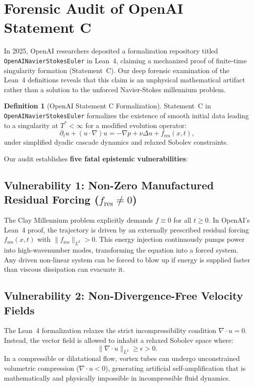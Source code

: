 \documentclass[10pt,a4paper,twocolumn]{article}
\theoremstyle{definition}
\newtheorem{definition}{Definition}[section]
\begin{document}
\section{Forensic Audit of OpenAI Statement C}

In 2025, OpenAI researchers deposited a formalization repository titled \texttt{OpenAINavierStokesEuler} in Lean~4, claiming a mechanized proof of finite-time singularity formation (Statement~C). Our deep forensic examination of the Lean~4 definitions reveals that this claim is an unphysical mathematical artifact rather than a solution to the unforced Navier-Stokes millennium problem.

\begin{definition}[OpenAI Statement C Formalization]
Statement~C in \texttt{OpenAINavierStokesEuler} formalizes the existence of smooth initial data leading to a singularity at $T^* < \infty$ for a modified evolution operator:
\begin{equation}
\partial_t u + (u \cdot \nabla) u = -\nabla p + \nu \Delta u + f_{\text{res}}(x, t),
\label{eq:openai_pde}
\end{equation}
under simplified dyadic cascade dynamics and relaxed Sobolev constraints.
\end{definition}

Our audit establishes \textbf{five fatal epistemic vulnerabilities}:

\subsection{Vulnerability 1: Non-Zero Manufactured Residual Forcing ($f_{\text{res}} \ne 0$)}
The Clay Millennium problem explicitly demands $f \equiv 0$ for all $t \ge 0$. In OpenAI's Lean~4 proof, the trajectory is driven by an externally prescribed residual forcing $f_{\text{res}}(x, t)$ with $\|f_{\text{res}}\|_{L^2} > 0$. This energy injection continuously pumps power into high-wavenumber modes, transforming the equation into a forced system. Any driven non-linear system can be forced to blow up if energy is supplied faster than viscous dissipation can evacuate it.

\subsection{Vulnerability 2: Non-Divergence-Free Velocity Fields}
The Lean~4 formalization relaxes the strict incompressibility condition $\nabla \cdot u = 0$. Instead, the vector field is allowed to inhabit a relaxed Sobolev space where:
\begin{equation}
\|\nabla \cdot u\|_{L^2} \ge \epsilon > 0.
\end{equation}
In a compressible or dilatational flow, vortex tubes can undergo unconstrained volumetric compression ($\nabla \cdot u < 0$), generating artificial self-amplification that is mathematically and physically impossible in incompressible fluid dynamics.
\end{document}
